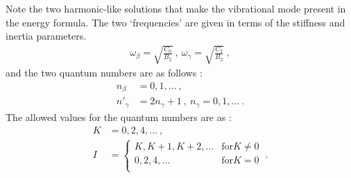 Note the two harmonic-like solutions that make the vibrational mode present in the energy formula. The two `frequencies' are given in terms of the stiffness and inertia parameters.
\begin{align}
\omega_\beta=\sqrt{\frac{C_0}{B_2}}\ ,\ \omega_\gamma=\sqrt{\frac{C_2}{B_2}}\ ,   
\end{align}
and the two quantum numbers are as follows \cite{li2022model}: 
\begin{align}
    n_\beta&=0,1,\dots\ ,\\
    n'_\gamma&=2n_\gamma+1\ ,\ n_\gamma=0,1,\dots\ .
\end{align}
The allowed values for the quantum numbers are as \cite{li2022model}:
\begin{align}
    K&=0,2,4,\dots\ ,\nonumber\\
    I&=\begin{cases}
        K,K+1,K+2,\dots &\text{for} K\neq 0\\
        0,2,4,\dots &\text{for} K=0\\
    \end{cases}\ .
\end{align}

